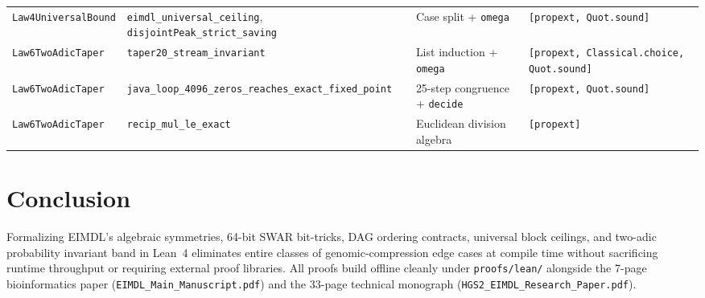 \documentclass[10pt]{article}
\begin{document}
\begin{table}[h!]
{\begin{tabular}{llll}
\texttt{Law4UniversalBound} & \texttt{eimdl\_universal\_ceiling}, \texttt{disjointPeak\_strict\_saving} & Case split + \texttt{omega} & \texttt{[propext, Quot.sound]} \\
\texttt{Law6TwoAdicTaper} & \texttt{taper20\_stream\_invariant} & List induction + \texttt{omega} & \texttt{[propext, Classical.choice, Quot.sound]} \\
\texttt{Law6TwoAdicTaper} & \texttt{java\_loop\_4096\_zeros\_reaches\_exact\_fixed\_point} & 25-step congruence + \texttt{decide} & \texttt{[propext, Quot.sound]} \\
\texttt{Law6TwoAdicTaper} & \texttt{recip\_mul\_le\_exact} & Euclidean division algebra & \texttt{[propext]} \\
\bottomrule
\end{tabular}%
}
\end{table}

\section{Conclusion}

Formalizing EIMDL's algebraic symmetries, 64-bit SWAR bit-tricks, DAG ordering contracts, universal block ceilings, and two-adic probability invariant band in Lean~4 eliminates entire classes of genomic-compression edge cases at compile time without sacrificing runtime throughput or requiring external proof libraries. All proofs build offline cleanly under \texttt{proofs/lean/} alongside the 7-page bioinformatics paper (\texttt{EIMDL\_Main\_Manuscript.pdf}) and the 33-page technical monograph (\texttt{HGS2\_EIMDL\_Research\_Paper.pdf}).



\end{document}
